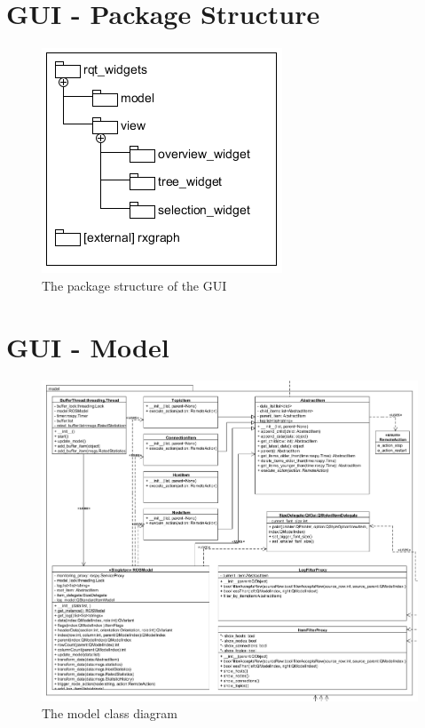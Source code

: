 \section{GUI - Package Structure}
\begin{figure}[!ht]
\begin{center}
\includegraphics[scale=1.0]{./bilder/package_structure_gui.png}
\caption{The package structure of the GUI}
\label{The package structure of the GUI}
\end{center}
\end{figure}

\mbox{}

\newpage


\section{GUI - Model}
\begin{figure}[!ht]
\begin{center}
\includegraphics[width=1.0\linewidth]{./diagram_pictures/model.png}
\caption{The model class diagram}
\end{center}
\end{figure}

